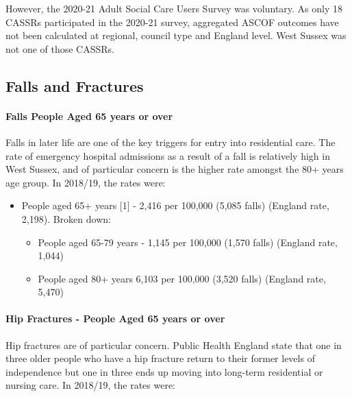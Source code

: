 However, the 2020-21 Adult Social Care Users Survey was voluntary. As only 18 CASSRs participated in the 2020-21 survey, aggregated ASCOF outcomes have not been calculated at regional, council type and England level. West Sussex was not one of those CASSRs.

\subsection{Falls and Fractures}
\paragraph{Falls People Aged 65 years or over} Falls in later life are one of the key triggers for entry into residential care. The rate of emergency hospital admissions as a result of a fall is relatively high in West Sussex, and of particular concern is the higher rate amongst the 80+ years age group. In 2018/19, the rates were:

\begin{itemize}[noitemsep]
    \item People aged 65+ years [1] - 2,416 per 100,000 (5,085 falls) (England rate, 2,198). Broken down:
    \begin{itemize}[noitemsep]
        \item People aged 65-79 years - 1,145 per 100,000 (1,570 falls) (England rate, 1,044)
        \item People aged 80+ years 6,103 per 100,000 (3,520 falls) (England rate, 5,470)
    \end{itemize}
\end{itemize}

\paragraph{Hip Fractures - People Aged 65 years or over} Hip fractures are of particular concern. Public Health England state that one in three older people who have a hip fracture return to their former levels of independence but one in three ends up moving into long-term residential or nursing care. In 2018/19, the rates were:


